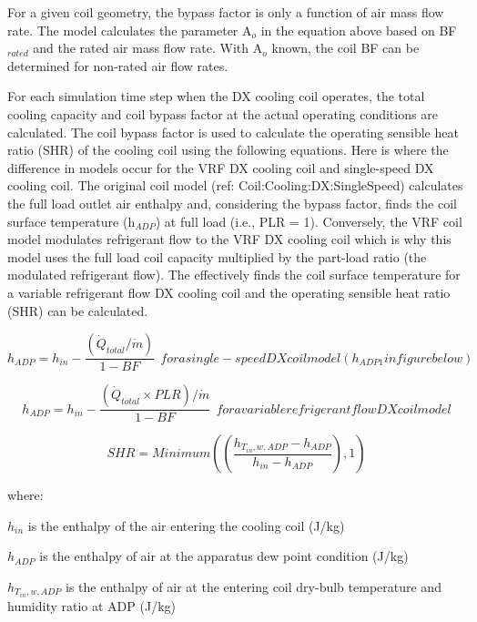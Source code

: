 For a given coil geometry, the bypass factor is only a function of air mass flow rate. The model calculates the parameter A\(_{o}\) in the equation above based on BF\(_{rated}\) and the rated air mass flow rate. With A\(_{o}\) known, the coil BF can be determined for non-rated air flow rates.

For each simulation time step when the DX cooling coil operates, the total cooling capacity and coil bypass factor at the actual operating conditions are calculated. The coil bypass factor is used to calculate the operating sensible heat ratio (SHR) of the cooling coil using the following equations. Here is where the difference in models occur for the VRF DX cooling coil and single-speed DX cooling coil. The original coil model (ref: Coil:Cooling:DX:SingleSpeed) calculates the full load outlet air enthalpy and, considering the bypass factor, finds the coil surface temperature (h\(_{ADP}\)) at full load (i.e., PLR = 1). Conversely, the VRF coil model modulates refrigerant flow to the VRF DX cooling coil which is why this model uses the full load coil capacity multiplied by the part-load ratio (the modulated refrigerant flow). The effectively finds the coil surface temperature for a variable refrigerant flow DX cooling coil and the operating sensible heat ratio (SHR) can be calculated.

\begin{equation}
{h_{ADP}} = {h_{in}} - \frac{{\left( {{\dot{Q}_{total}}/ \dot{m}} \right)}}{{1 - BF}} ~~for a single-speed DX coil model (h_{ADP1} in figure below)
\end{equation}

\begin{equation}
{h_{ADP}} = {h_{in}} - \frac{{\left( {{\dot{Q}_{total}} \times PLR} \right) / \dot{m}}}{{1 - BF}} ~~for a variable refrigerant flow DX coil model
\end{equation}

\begin{equation}
SHR = Minimum\left( {\left( {\frac{{{h_{T_{in},w,ADP}} - {h_{ADP}}}}{{{h_{in}} - {h_{ADP}}}}} \right),1} \right)
\end{equation}

where:

\({{h_{in}}}\) is the enthalpy of the air entering the cooling coil (J/kg)

\({{h_{ADP}}}\) is the enthalpy of air at the apparatus dew point condition (J/kg)

\({{h_{T_{in},w,ADP}}}\) is the enthalpy of air at the entering coil dry-bulb temperature and humidity ratio at ADP (J/kg)

